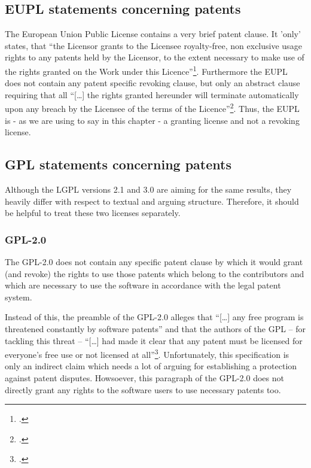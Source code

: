 \subsection{EUPL statements concerning patents}\label{subsec:EupLPatentClause}
The European Union Public License contains a very brief patent clause. It 'only'
states, that \enquote{the Licensor grants to the Licensee royalty-free, non
exclusive usage rights to any patents held by the Licensor, to the extent
necessary to make use of the rights granted on the Work under this
Licence}\footcite[cf.][\nopage wp.\ §2 at its tail]{EuplLicense2007en}.
Furthermore the EUPL does not contain any patent specific revoking clause, but
only an abstract clause requiring that all \enquote{[\ldots] the rights granted
hereunder will terminate automatically upon any breach by the Licensee of the
terms of the Licence}\footcite[cf.][\nopage wp.\ §12]{EuplLicense2007en}. Thus,
the EUPL is - as we are using to say in this chapter - a granting license and
not a revoking license.

\subsection{GPL statements concerning patents}

Although the LGPL versions 2.1 and 3.0 are aiming for the same results, they
heavily differ with respect to textual and arguing structure. Therefore, it
should be helpful to treat these two licenses separately.

\subsubsection {GPL-2.0} \label{subsec:Gpl21PatentClause}

The GPL-2.0 does not contain any specific patent clause by which it would grant
(and revoke) the rights to use those patents which belong to the contributors
and  which are necessary to use the software in accordance with the legal patent
system.

Instead of this, the preamble of the GPL-2.0 alleges that \enquote{[\ldots] any
free program is threatened constantly by software patents} and that the authors
of the GPL -- for tackling this threat -- \enquote{[\ldots] had made it clear
that any patent must be licensed for everyone's free use or not licensed at
all}\footcite[cf.][\nopage wp., Preamble]{Gpl20OsiLicense1991a}. Unfortunately,
this specification is only an indirect claim which needs a lot of arguing for
establishing a protection against patent disputes. Howsoever, this paragraph of
the GPL-2.0 does not directly grant any rights to the software users to use
necessary patents too.


